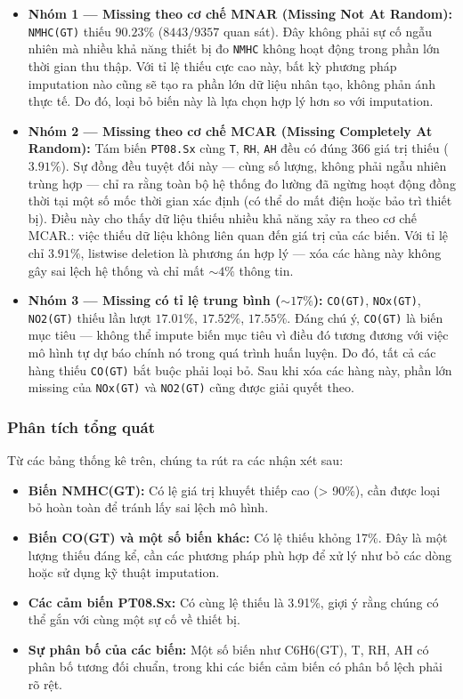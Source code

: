 \documentclass[12pt,a4paper]{report}
\begin{document}
\begin{itemize}
    \item \textbf{Nhóm 1 --- Missing theo cơ chế MNAR (Missing Not At Random):} \texttt{NMHC(GT)} thiếu $90.23\%$ ($8443/9357$ quan sát). Đây không phải sự cố ngẫu nhiên mà nhiều khả năng thiết bị đo \texttt{NMHC} không hoạt động trong phần lớn thời gian thu thập. Với tỉ lệ thiếu cực cao này, bất kỳ phương pháp imputation nào cũng sẽ tạo ra phần lớn dữ liệu nhân tạo, không phản ánh thực tế. Do đó, loại bỏ biến này là lựa chọn hợp lý hơn so với imputation.
    
    \item \textbf{Nhóm 2 --- Missing theo cơ chế MCAR (Missing Completely At Random):} Tám biến \texttt{PT08.Sx} cùng \texttt{T}, \texttt{RH}, \texttt{AH} đều có đúng $366$ giá trị thiếu ($3.91\%$). Sự đồng đều tuyệt đối này --- cùng số lượng, không phải ngẫu nhiên trùng hợp --- chỉ ra rằng toàn bộ hệ thống đo lường đã ngừng hoạt động đồng thời tại một số mốc thời gian xác định (có thể do mất điện hoặc bảo trì thiết bị). Điều này cho thấy dữ liệu thiếu nhiều khả năng xảy ra theo cơ chế MCAR.: việc thiếu dữ liệu không liên quan đến giá trị của các biến. Với tỉ lệ chỉ $3.91\%$, listwise deletion là phương án hợp lý --- xóa các hàng này không gây sai lệch hệ thống và chỉ mất $\sim 4\%$ thông tin.
    
    \item \textbf{Nhóm 3 --- Missing có tỉ lệ trung bình ($\sim 17\%$):} \texttt{CO(GT)}, \texttt{NOx(GT)}, \texttt{NO2(GT)} thiếu lần lượt $17.01\%$, $17.52\%$, $17.55\%$. Đáng chú ý, \texttt{CO(GT)} là biến mục tiêu --- không thể impute biến mục tiêu vì điều đó tương đương với việc mô hình tự dự báo chính nó trong quá trình huấn luyện. Do đó, tất cả các hàng thiếu \texttt{CO(GT)} bắt buộc phải loại bỏ. Sau khi xóa các hàng này, phần lớn missing của \texttt{NOx(GT)} và \texttt{NO2(GT)} cũng được giải quyết theo.
\end{itemize}

\subsubsection{Phân tích tổng quát}
 
Từ các bảng thống kê trên, chúng ta rút ra các nhận xét sau:
 
\begin{itemize}
    \item \textbf{Biến NMHC(GT):} Có lệ giá trị khuyết thiếp cao (> 90\%), cần được loại bỏ hoàn toàn để tránh lấy sai lệch mô hình.
    \item \textbf{Biến CO(GT) và một số biến khác:} Có lệ thiếu khỏng 17\%. Đây là một lượng thiếu đáng kể, cần các phương pháp phù hợp để xử lý như bỏ các dòng hoặc sử dụng kỹ thuật imputation.
    \item \textbf{Các cảm biến PT08.Sx:} Có cùng lệ thiếu là 3.91\%, giợi ý rằng chúng có thể gắn với cùng một sự cố về thiết bị.
    \item \textbf{Sự phân bố của các biến:} Một số biến như C6H6(GT), T, RH, AH có phân bố tương đối chuẩn, trong khi các biến cảm biến có phân bố lệch phải rõ rệt.
\end{itemize}
\end{document}

